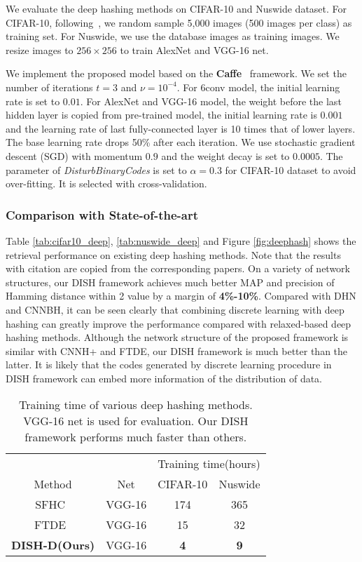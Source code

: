 \documentclass[conference]{IEEEtran}
\begin{document}
We evaluate the deep hashing methods on CIFAR-10 and Nuswide dataset. For CIFAR-10, following~\cite{xia2014supervised}, we random sample 5,000 images (500 images per class) as training set. For Nuswide, we use the database images as training images. We resize images to $256 \times 256$ to train AlexNet and VGG-16 net.

We implement the proposed model based on the \textbf{Caffe}~\cite{jia2014caffe} framework. We set the number of iterations $t=3$ and $\nu=10^{-4}$. For 6conv model, the initial learning rate is set to $0.01$. For AlexNet and VGG-16 model, the weight before the last hidden layer is copied from pre-trained model, the initial learning rate is $0.001$ and the learning rate of last fully-connected layer is 10 times that of lower layers. The base learning rate drops 50\% after each iteration. We use stochastic gradient descent (SGD) with momentum $0.9$ and the weight decay is set to $0.0005$. The parameter of {\em DisturbBinaryCodes} is set to $\alpha=0.3$ for CIFAR-10 dataset to avoid over-fitting. It is selected with cross-validation.

\subsubsection{Comparison with State-of-the-art}
Table \ref{tab:cifar10_deep}, \ref{tab:nuswide_deep} and Figure \ref{fig:deephash} shows the retrieval performance on existing deep hashing methods. Note that the results with citation are copied from the corresponding papers. On a variety of network structures, our DISH framework achieves much better MAP and precision of Hamming distance within 2 value by a margin of \textbf{4\%-10\%}. Compared with DHN and CNNBH, it can be seen clearly that combining discrete learning with deep hashing can greatly improve the performance compared with relaxed-based deep hashing methods. Although the network structure of the proposed framework is similar with CNNH+ and FTDE, our DISH framework is much better than the latter. It is likely that the codes generated by discrete learning procedure in DISH framework can embed more information of the distribution of data.


\begin{table}[t]
    \centering
    \footnotesize
    \begin{tabular}{c|c|cc}
        \hline
         & & \multicolumn{2}{c}{Training time(hours)} \\
        Method & Net & CIFAR-10 & Nuswide \\
        \hline
        SFHC~\cite{zhuang2016fast} & VGG-16 & 174 & 365 \\
        FTDE~\cite{zhuang2016fast} & VGG-16 & 15 & 32 \\
        \textbf{DISH-D(Ours)} & VGG-16 & \textbf{4} & \textbf{9} \\
        \hline
    \end{tabular}
    \caption{Training time of various deep hashing methods. VGG-16 net is used for evaluation. Our DISH framework performs much faster than others.}
    \label{tab:deep_time}
\end{table}
\end{document}
